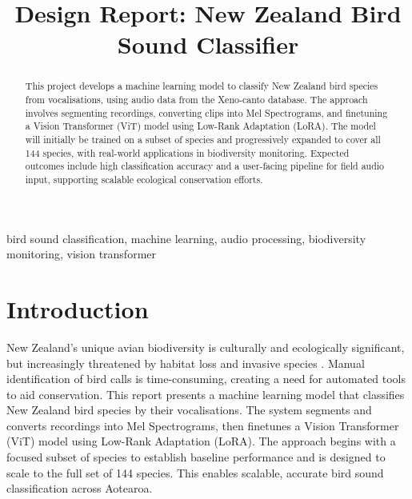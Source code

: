 \documentclass[conference,a4paper]{IEEEtran}
\begin{document}
\title{Design Report: New Zealand Bird Sound Classifier}

\author{
}

\maketitle

\begin{abstract}
This project develops a machine learning model to classify New Zealand bird species from vocalisations, using audio data from the Xeno-canto database. The approach involves segmenting recordings, converting clips into Mel Spectrograms, and finetuning a Vision Transformer (ViT) model using Low-Rank Adaptation (LoRA). The model will initially be trained on a subset of species and progressively expanded to cover all 144 species, with real-world applications in biodiversity monitoring. Expected outcomes include high classification accuracy and a user-facing pipeline for field audio input, supporting scalable ecological conservation efforts.
\end{abstract}

\begin{IEEEkeywords}
bird sound classification, machine learning, audio processing, biodiversity monitoring, vision transformer
\end{IEEEkeywords}

\section{Introduction}
New Zealand’s unique avian biodiversity is culturally and ecologically significant, but increasingly threatened by habitat loss and invasive species \cite{b1}. Manual identification of bird calls is time-consuming, creating a need for automated tools to aid conservation. This report presents a machine learning model that classifies New Zealand bird species by their vocalisations. The system segments and converts recordings into Mel Spectrograms, then finetunes a Vision Transformer (ViT) model using Low-Rank Adaptation (LoRA). The approach begins with a focused subset of species to establish baseline performance and is designed to scale to the full set of 144 species. This enables scalable, accurate bird sound classification across Aotearoa.
\end{document}
